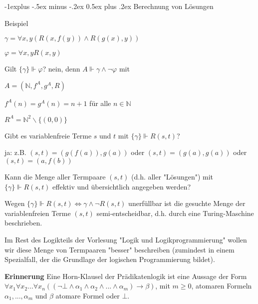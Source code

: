 \documentclass[a4paper]{article}
\makeatletter
\renewcommand{\note}[2]{\begin{noteBox} \textbf{#1} #2 \end{noteBox}}
\renewcommand{\subsection}{\@startsection{subsection}{2}{0mm}%
                {-1explus -.5ex minus -.2ex}%
                {0.5ex plus .2ex}%
                {\normalfont\normalsize\bfseries}}
\makeatother
\begin{document}
\begin{multicols}{3}
  \subsection{Berechnung von Lösungen}
  \begin{itemize*}
    \item Beispiel
    \begin{itemize*}
      \item $\gamma = \forall x,y (R(x,f(y))\wedge R(g(x),y))$
      \item $\varphi = \forall x,yR(x,y)$
    \end{itemize*}
    \item Gilt $\{\gamma\}\Vdash\varphi$? nein, denn $A\Vdash\gamma\wedge\lnot\varphi$ mit
    \begin{itemize*}
      \item $A=(\mathbb{N},f^A,g^A,R)$
      \item $f^A(n)=g^A(n)=n+1$ für alle $n\in\mathbb{N}$
      \item $R^A = \mathbb{N}^2 \backslash\{( 0 , 0 )\}$
    \end{itemize*}
    \item Gibt es variablenfreie Terme $s$ und $t$ mit $\{\gamma\}\Vdash R(s,t)$?
    \begin{itemize*}
      \item ja: z.B. $(s,t)=(g(f(a)),g(a))$ oder $(s,t)=(g(a),g(a))$ oder $(s,t)=(a,f(b))$
    \end{itemize*}
    \item Kann die Menge aller Termpaare $(s,t)$ (d.h. aller "Lösungen") mit $\{\gamma\}\Vdash R(s,t)$ effektiv und übersichtlich angegeben werden?
    \begin{itemize*}
      \item Wegen $\{\gamma\}\Vdash R(s,t) \Leftrightarrow\gamma\wedge\lnot R(s,t)$ unerfüllbar ist die gesuchte Menge der variablenfreien Terme $(s,t)$ semi-entscheidbar, d.h. durch eine Turing-Maschine beschrieben.
    \end{itemize*}
    \item Im Rest des Logikteils der Vorlesung "Logik und Logikprogrammierung" wollen wir diese Menge von Termpaaren "besser" beschreiben (zumindest in einem Spezialfall, der die Grundlage der logischen Programmierung bildet).
  \end{itemize*}

  \note{Erinnerung}{Eine Horn-Klausel der Prädikatenlogik ist eine Aussage der Form $\forall x_1\forall x_2...\forall x_n ((\lnot\bot\wedge\alpha_1 \wedge\alpha_2 \wedge...\wedge\alpha_m)\rightarrow\beta)$, mit $m\geq 0$, atomaren Formeln $\alpha_1,...,\alpha_m$ und $\beta$ atomare Formel oder $\bot$.}


\end{multicols}
\end{document}
